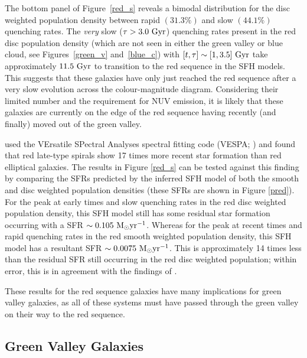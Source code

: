 The bottom panel of Figure~\ref{red_s} reveals a bimodal distribution for the disc weighted population density between rapid $(31.3\%)$ and slow $(44.1\%)$ quenching rates. The \emph{very} slow ($\tau > 3.0 ~\rm{Gyr}$) quenching rates present in the red disc population density (which are not seen in either the green valley or blue cloud, see Figures~\ref{green_v} and~\ref{blue_c}) with $[t, \tau] \sim [1, 3.5]~\rm{Gyr}$ take approximately $11.5~\rm{Gyr}$ to transition to the red sequence in the SFH models. This suggests that these galaxies have only just reached the red sequence after a very slow evolution across the colour-magnitude diagram. Considering their limited number and the requirement for NUV emission, it is likely that these galaxies are currently on the edge of the red sequence having recently (and finally) moved out of the green valley. 

\citet{tojeiro13} used the VErsatile SPectral Analyses spectral fitting code (VESPA; \citealt{tojeiro07}) and found that red late-type spirals show 17 times more recent star formation than red elliptical galaxies. The results in Figure \ref{red_s} can be tested against this finding  by comparing the SFRs predicted by the inferred SFH model of both the smooth and disc weighted population densities (these SFRs are shown in Figure \ref{pred}). For the peak at early times and slow quenching rates in the red disc weighted population density, this SFH model still has some residual star formation occurring with a SFR$~\sim0.105~\rm{M}_{\odot}yr^{-1}$. Whereas for the peak at recent times and rapid quenching rates in the red smooth weighted population density, this SFH model has a resultant SFR$~\sim0.0075~\rm{M}_{\odot}yr^{-1}$. This is approximately 14 times less than the residual SFR still occurring in the red disc weighted population; within error, this is in agreement with the findings of \citet{tojeiro13}. 

These results for the red sequence galaxies have many implications for green valley galaxies, as all of these systems must have passed through the green valley on their way to the red sequence.


\subsection{Green Valley Galaxies}\label{gv}

